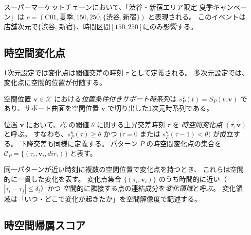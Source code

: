 \begin{example}
スーパーマーケットチェーンにおいて、「渋谷・新宿エリア限定 夏季キャンペーン」は
$e = (\text{C01}, \text{夏季}, 150, 250, \{\text{渋谷}, \text{新宿}\})$ と表現される。
このイベントは店舗次元で$\{$渋谷, 新宿$\}$、時間区間$[150, 250]$にのみ影響する。
\end{example}

\subsection{時空間変化点}

1次元設定では変化点は閾値交差の時刻 $\tau$ として定義される。
多次元設定では、変化点に空間的位置が付随する。

\begin{definition}[位置条件付きサポート時系列]\label{def:local_series}
空間位置 $\mathbf{v} \in \mathcal{X}$ における\emph{位置条件付きサポート時系列}は
$s_P^{\mathbf{v}}(t) = S_P(t, \mathbf{v})$
であり、サポート曲面を空間位置 $\mathbf{v}$ で切り出した1次元時系列である。
\end{definition}

\begin{definition}[時空間変化点]\label{def:st_changepoint}
位置 $\mathbf{v}$ において、$s_P^{\mathbf{v}}$ の閾値 $\theta$ に関する上昇交差時刻 $\tau$ を
\emph{時空間変化点} $(\tau, \mathbf{v})$ と呼ぶ。
すなわち、$s_P^{\mathbf{v}}(\tau) \geq \theta$ かつ $(\tau = 0$ または $s_P^{\mathbf{v}}(\tau-1) < \theta)$ が成立する。
下降交差も同様に定義する。
パターン $P$ の時空間変化点の集合を $\mathcal{C}_P = \{(\tau_i, \mathbf{v}_i, \textit{dir}_i)\}$ と表す。
\end{definition}

\begin{remark}[変化領域]
同一パターンが近い時刻に複数の空間位置で変化点を持つとき、
これらは空間的に一貫した変化を表す。
変化点集合 $\{(\tau_i, \mathbf{v}_i)\}$ のうち時間的に近い（$|\tau_i - \tau_j| \leq \delta_t$）かつ
空間的に隣接する点の連結成分を\emph{変化領域}と呼ぶ。
変化領域は「いつ・どこで変化が起きたか」を空間解像度で記述する。
\end{remark}

\subsection{時空間帰属スコア}


